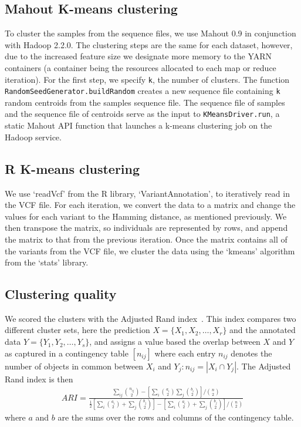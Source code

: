 \documentclass{bioinfo}
\begin{document}
\begin{methods}
\subsection*{Mahout K-means clustering}
To cluster the samples from the sequence files, we use Mahout 0.9 in conjunction with Hadoop 2.2.0. 
The clustering steps are the same for each dataset, however, due to the increased feature size we designate more memory to the
YARN containers (a container being the resources allocated to each map or reduce iteration). For the first step, we specify \texttt{k},
the number of clusters. The function \texttt{RandomSeedGenerator.buildRandom} creates a new sequence file containing \texttt{k}
random centroids from the samples sequence file. The sequence file
of samples and the sequence file of centroids serve as the input to \texttt{KMeansDriver.run}, a static Mahout API function that launches
a k-means clustering job on the Hadoop service. 


\subsection*{R K-means clustering}
We use `readVcf' from the R library, `VariantAnnotation', to iteratively read in the VCF file. For each iteration, we convert the data to a matrix and
change the values for each variant to the Hamming distance, as mentioned previously. We then transpose the matrix, so individuals are represented
by rows, and append the matrix to that from the previous iteration. Once the matrix contains all of the variants from the VCF file, we cluster the data
using the `kmeans' algorithm from the `stats' library.



\subsection*{Clustering quality}
We scored the clusters with the Adjusted Rand index~\cite{Hubert1985}. 
This index compares two different cluster sets, here the prediction $X = \{ X_1, X_2, \ldots , X_r \}$ and the annotated data $Y = \{ Y_1, Y_2, \ldots , Y_s \}$, and assigns a value based the overlap between $X$ and $Y$ as captured in a contingency table $\left[n_{ij}\right]$ where each entry $n_{ij}$ denotes the number of objects in common between $X_i$ and $Y_j : n_{ij}=|X_i \cap Y_j|$. 
The Adjusted Rand index is then 
{\tiny
\begin{eqnarray*}
ARI=\frac{\sum_{ij}{{n_{ij}\choose 2}} - \left[ \sum_{i}{{a_i\choose2}} \sum_{j}{{b_i\choose2}} \right] / {n\choose2}}{\frac{1}{2} \left[ \sum_{i}{{a_{i}\choose 2} + \sum_{j}{{b_{j}\choose 2}}} \right] - \left[ \sum_{i}{{a_{i}\choose 2} + \sum_{j}{{b_{j}\choose 2}}} \right] / {n\choose2}} 
\end{eqnarray*}
}
where $a$ and $b$ are the sums over the rows and columns of the contingency table.


\end{methods}
\end{document}
